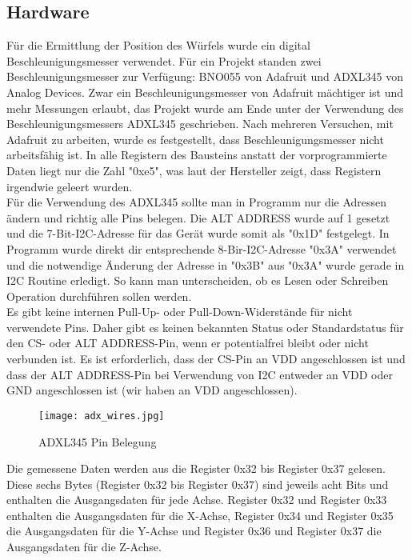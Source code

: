 
\subsection{Hardware}
Für die Ermittlung der Position des Würfels wurde ein digital Beschleunigungsmesser verwendet. Für ein Projekt standen zwei Beschleunigungsmesser zur Verfügung: BNO055 von Adafruit und ADXL345 von Analog Devices. Zwar ein Beschleunigungsmesser von Adafruit mächtiger ist und mehr Messungen erlaubt, das Projekt wurde am Ende unter der Verwendung des Beschleunigungsmessers ADXL345 geschrieben. Nach mehreren Versuchen, mit Adafruit zu arbeiten, wurde es festgestellt, dass Beschleunigungsmesser nicht arbeitsfähig ist. In alle Registern des Bausteins anstatt der vorprogrammierte Daten liegt nur die Zahl "0xe5", was laut der Hersteller zeigt, dass Registern irgendwie geleert wurden.\\

Für die Verwendung des ADXL345 sollte man in Programm nur die Adressen ändern und richtig alle Pins belegen. Die ALT ADDRESS wurde auf 1 gesetzt und die 7-Bit-I2C-Adresse für das Gerät wurde somit als "0x1D" festgelegt. In Programm wurde direkt dir entsprechende 8-Bir-I2C-Adresse "0x3A" verwendet und die notwendige Änderung der Adresse in "0x3B" aus "0x3A" wurde gerade in I2C Routine erledigt. So kann man unterscheiden, ob es Lesen oder Schreiben Operation durchführen sollen werden. \\

Es gibt keine internen Pull-Up- oder Pull-Down-Widerstände für nicht verwendete Pins. Daher gibt es keinen bekannten Status oder Standardstatus für den CS- oder ALT ADDRESS-Pin, wenn er potentialfrei bleibt oder nicht verbunden ist. Es ist erforderlich, dass der CS-Pin an VDD  angeschlossen ist und dass der ALT ADDRESS-Pin bei Verwendung von I2C entweder an VDD oder GND angeschlossen ist (wir haben an VDD angeschlossen).\\

\begin{figure}[!h]
	\centering
	\texttt{[image: adx\_wires.jpg]}
	\caption[AXL345 Pin Belegung]{ADXL345 Pin Belegung}
	\label{fig:i2cwires}
\end{figure}

Die gemessene Daten werden aus die Register 0x32 bis Register 0x37 gelesen. Diese sechs Bytes (Register 0x32 bis Register 0x37) sind jeweils acht Bits und enthalten die Ausgangsdaten für jede Achse. Register 0x32 und Register 0x33 enthalten die Ausgangsdaten für die X-Achse, Register 0x34 und Register 0x35 die Ausgangsdaten für die Y-Achse und Register 0x36 und Register 0x37 die Ausgangsdaten für die Z-Achse. \\

